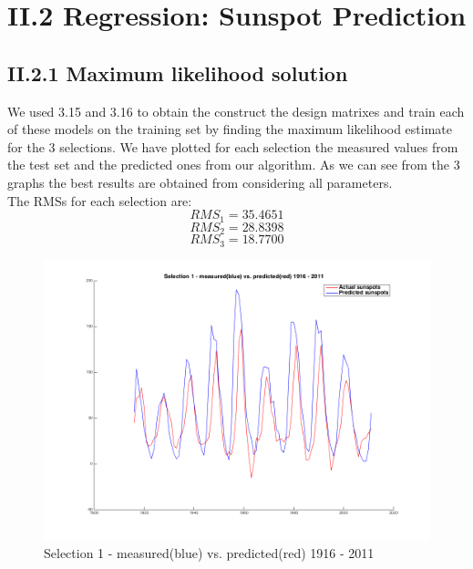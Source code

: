 \documentclass{article}      %
\begin{document}
\section*{II.2 Regression: Sunspot Prediction}

\subsection*{II.2.1 Maximum likelihood solution}

We used 3.15 and 3.16 to obtain the construct the design matrixes and train each of these models on the training set by finding the maximum likelihood estimate for the 3 selections. We have plotted for each selection the measured values from the test set and the predicted ones from our algorithm. As we can see from the 3 graphs the best results are obtained from considering all parameters.\\

The RMSs for each selection are: \\
\[ RMS_1 = 35.4651\]
\[ RMS_2 = 28.8398\]
\[ RMS_3 = 18.7700\]


\begin{figure}[ht]
\centering
\includegraphics[scale=.4]{img/pred1}
\caption{Selection 1 - measured(blue) vs. predicted(red) 1916 - 2011 \label{overflow}}
\end{figure}
\end{document}
